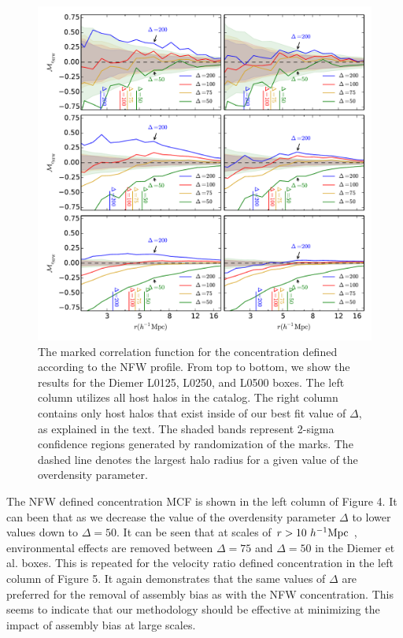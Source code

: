 \documentclass[usenatbib,usegraphicx,letterpaper]{mn2e}
\begin{document}
\begin{figure}
	\centering
	\includegraphics[width=\textwidth]{all_mcf_cnfw_z00_hostsvmatch.pdf}
	\caption{The marked correlation function for the concentration defined according to the NFW profile. From top to bottom, we show the results for the Diemer L0125, L0250, and L0500 boxes. The left column utilizes all host halos in the catalog. The right column contains only host halos that exist inside of our best fit value of $\Delta$, as explained in the text. The shaded bands represent 2-sigma confidence regions generated by randomization of the marks. The dashed line denotes the largest halo radius for a given value of the overdensity parameter. }
\end{figure}

The NFW defined concentration MCF is shown in the left column of Figure 4. It can been that as we decrease the value of the overdensity parameter $\Delta$ to lower values down to $\Delta = 50$. It can be seen that at scales of $r > 10 \ h^{-1}\mathrm{Mpc}~$, environmental effects are removed between $\Delta = 75$ and $\Delta = 50$ in the Diemer et al. boxes. This is repeated for the velocity ratio defined concentration in the left column of Figure 5. It again demonstrates that the same values of $\Delta$ are preferred for the removal of assembly bias as with the NFW concentration. This seems to indicate that our methodology should be effective at minimizing the impact of assembly bias at large scales.
\end{document}
